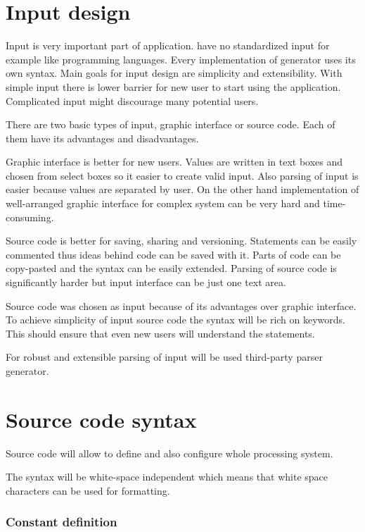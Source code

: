 
\section{Input design}

Input is very important part of application.
\lsystems have no standardized input for example like programming languages.
Every implementation of \lsystem generator uses its own syntax.
Main goals for input design are simplicity and extensibility.
With simple input there is lower barrier for new user to start using the application.
Complicated input might discourage many potential users.

There are two basic types of input, graphic interface or source code.
Each of them have its advantages and disadvantages.

Graphic interface is better for new users.
Values are written in text boxes and chosen from select boxes so it easier to create valid input.
Also parsing of input is easier because values are separated by user.
On the other hand implementation of well-arranged graphic interface for complex system can be very hard and time-consuming.

Source code is better for saving, sharing and versioning.
Statements can be easily commented thus ideas behind code can be saved with it.
Parts of code can be copy-pasted and the syntax can be easily extended.
Parsing of source code is significantly harder but input interface can be just one text area.

Source code was chosen as input because of its advantages over graphic interface.
To achieve simplicity of input source code the syntax will be rich on keywords.
This should ensure that even new users will understand the statements.

For robust and extensible parsing of input will be used third-party parser generator.



\section{Source code syntax}

Source code will allow to define \lsystems and also configure whole processing system.

The syntax will be white-space independent which means that white space characters can be used for formatting.


\subsubsection{Constant definition}



















